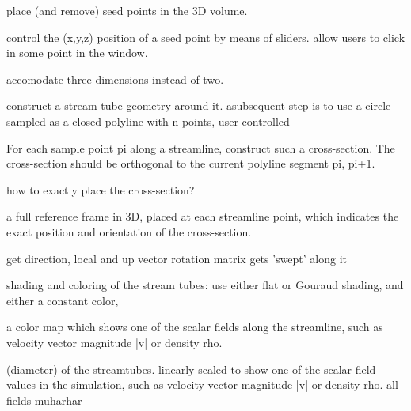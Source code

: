  
 place (and remove) seed points in the 3D volume.
 
 control the (x,y,z) position of a seed point by means of sliders. 
 allow users to click in some point in the window. 
 
 
  accomodate three dimensions instead of two.
  
  
  
construct a stream tube geometry around it. 
asubsequent step is to use a circle sampled as a closed polyline with n points, user-controlled

 For each sample point pi along a streamline, construct such a cross-section. The cross-section should be orthogonal to the current polyline segment pi, pi+1.
 
 
 
 how to exactly place the cross-section? 
 
 a full reference frame in 3D, placed at each streamline point, which indicates the exact position and orientation of the cross-section. 
 
 get direction, local and up vector
 rotation matrix
 gets 'swept' along it
 
 
 shading and coloring of the stream tubes: use either flat or Gouraud shading, and either a constant color, 
 
 
 a color map which shows one of the scalar fields along the streamline, such as velocity vector magnitude |v| or density rho.

(diameter) of the streamtubes. 
linearly scaled to show one of the scalar field values in the simulation, such as velocity vector magnitude |v| or density rho. 
all fields muharhar



